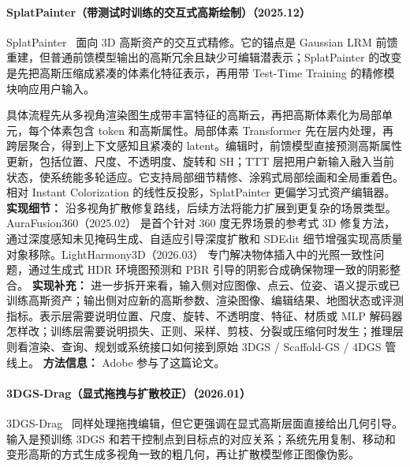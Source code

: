\paragraph{SplatPainter（带测试时训练的交互式高斯绘制）（2025.12）}
SplatPainter~\cite{2512_05354} 面向 3D 高斯资产的交互式精修。它的锚点是 Gaussian LRM 前馈重建，但普通前馈模型输出的高斯冗余且缺少可编辑潜表示；SplatPainter 的改变是先把高斯压缩成紧凑的体素化特征表示，再用带 Test-Time Training 的精修模块响应用户输入。

具体流程先从多视角渲染图生成带丰富特征的高斯云，再把高斯体素化为局部单元，每个体素包含 token 和高斯属性。局部体素 Transformer 先在层内处理，再跨层聚合，得到上下文感知且紧凑的 latent。编辑时，前馈模型直接预测高斯属性更新，包括位置、尺度、不透明度、旋转和 SH；TTT 层把用户新输入融入当前状态，使系统能多轮适应。它支持局部细节精修、涂鸦式局部绘画和全局重着色。相对 Instant Colorization 的线性反投影，SplatPainter 更偏学习式资产编辑器。
\textbf{实现细节：} 沿多视角扩散修复路线，后续方法将能力扩展到更复杂的场景类型。AuraFusion360（2025.02） 是首个针对 360 度无界场景的参考式 3D 修复方法，通过深度感知未见掩码生成、自适应引导深度扩散和 SDEdit 细节增强实现高质量对象移除。LightHarmony3D（2026.03） 专门解决物体插入中的光照一致性问题，通过生成式 HDR 环境图预测和 PBR 引导的阴影合成确保物理一致的阴影整合。
\textbf{实现补充：} 进一步拆开来看，输入侧对应图像、点云、位姿、语义提示或已训练高斯资产；输出侧对应新的高斯参数、渲染图像、编辑结果、地图状态或评测指标。表示层需要说明位置、尺度、旋转、不透明度、特征、材质或 MLP 解码器怎样改；训练层需要说明损失、正则、采样、剪枝、分裂或压缩何时发生；推理层则看渲染、查询、规划或系统接口如何接到原始 3DGS / Scaffold-GS / 4DGS 管线上。
\textbf{方法信息：} Adobe 参与了这篇论文。
\paragraph{3DGS-Drag（显式拖拽与扩散校正）（2026.01）}
3DGS-Drag~\cite{2601_07963} 同样处理拖拽编辑，但它更强调在显式高斯层面直接给出几何引导。输入是预训练 3DGS 和若干控制点到目标点的对应关系；系统先用复制、移动和变形高斯的方式生成多视角一致的粗几何，再让扩散模型修正图像伪影。

